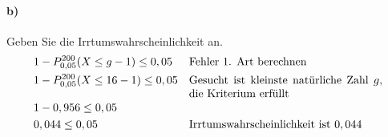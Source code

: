 \documentclass[10pt]{article}
\begin{document}
\begin{example}
\paragraph{b)} Geben Sie die Irrtumswahrscheinlichkeit an.
\begin{align*}
&1 - P^{200}_{0,05}(X \leq g - 1) \leq 0,05 &\parbox[t]{0.5\linewidth}{Fehler 1. Art berechnen} \\
&1 - P^{200}_{0,05}(X \leq 16 - 1) \leq 0,05 &\parbox[t]{0.5\linewidth}{Gesucht ist kleinste natürliche Zahl $g$, die Kriterium erfüllt} \\
&1 - 0,956 \leq 0,05 &\parbox[t]{0.5\linewidth}{} \\
&0,044 \leq 0,05 &\parbox[t]{0.5\linewidth}{Irrtumswahrscheinlichkeit ist $0,044$}
\end{align*}
\end{example}
\end{document}
